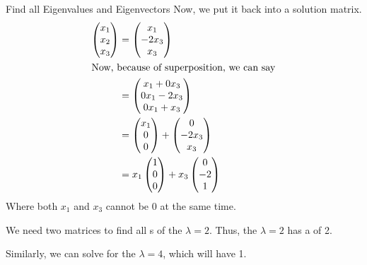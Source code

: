 \begin{example}{Find all Eigenvalues and Eigenvectors}
  Now, we put it back into a solution matrix.
  \begin{align*}
    \begin{pmatrix}
      x_{1} \\
      x_{2} \\
      x_{3}
    \end{pmatrix} &=
                    \begin{pmatrix}
                      x_{1} \\
                      -2x_{3} \\
                      x_{3}
                    \end{pmatrix} \\
    \intertext{Now, because of superposition, we can say}
    &=
      \begin{pmatrix}
        x_{1} + 0x_{3} \\
        0x_{1} - 2x_{3} \\
        0x_{1} + x_{3}
      \end{pmatrix} \\
    &=
      \begin{pmatrix}
        x_{1} \\
        0 \\
        0
      \end{pmatrix} +
    \begin{pmatrix}
      0 \\
      -2x_{3} \\
      x_{3}
    \end{pmatrix} \\
    &= x_{1}
      \begin{pmatrix}
        1 \\
        0 \\
        0 \\
      \end{pmatrix} +
    x_{3}
    \begin{pmatrix}
      0 \\
      -2 \\
      1
    \end{pmatrix}
  \end{align*}
  Where both $x_{1}$ and $x_{3}$ cannot be $0$ at the same time.

  We need two matrices to find all s of the  $\lambda = 2$.
  Thus, the  $\lambda = 2$ has a  of 2.

  Similarly, we can solve for the  $\lambda = 4$, which will have  1.
\end{example}

